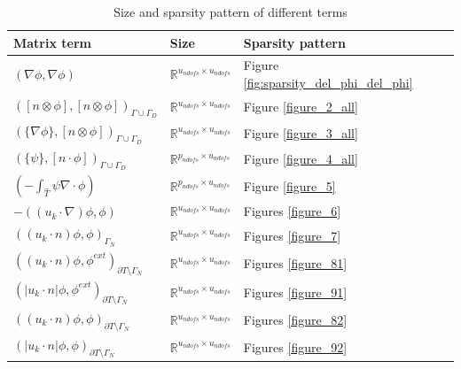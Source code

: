 \documentclass[a4paper,twoside,openright]{book}
\begin{document}
\begin{table}[H]
\caption{Size and sparsity pattern of different terms}
\begin{center}
\begin{tabular}{|p{}| p{} |  p{}|}
\hline
\textbf{Matrix term} & \textbf{Size} & \textbf{Sparsity pattern} \\
\hline
$(\nabla \phi, \nabla \phi)$ & $\mathbb{R}^{u_{ndofs} \times u_{ndofs}}$ & Figure \ref{fig:sparsity_del_phi_del_phi}\\
\hline
$([n \otimes \phi],[n \otimes \phi])_{\Gamma \cup \Gamma_D}$ & $\mathbb{R}^{u_{ndofs} \times u_{ndofs}}$ & Figure \ref{figure_2_all}\\
\hline
$(\lbrace \nabla \phi \rbrace,[n \otimes \phi])_{\Gamma \cup \Gamma_D}$ & $\mathbb{R}^{u_{ndofs} \times u_{ndofs}}$ & Figure \ref{figure_3_all}\\
\hline
$(\lbrace \psi \rbrace,[n \cdot \phi])_{\Gamma \cup \Gamma_D}$ & $\mathbb{R}^{p_{ndofs} \times u_{ndofs}}$ & Figure \ref{figure_4_all}\\
\hline
$(- \int_{\hat{T}} \psi \nabla \cdot \phi)$ & $\mathbb{R}^{p_{ndofs} \times u_{ndofs}}$ & Figure \ref{figure_5} \\
\hline
$-((u_k \cdot \nabla)\phi , \phi)$ & $\mathbb{R}^{u_{ndofs} \times u_{ndofs}}$ & Figures \ref{figure_6}\\
\hline
$((u_k \cdot n)\phi , \phi)_{\Gamma_N}$ & $\mathbb{R}^{u_{ndofs} \times u_{ndofs}}$ & Figures \ref{figure_7}\\
\hline
$((u_k \cdot n)\phi,\phi^{ext})_{\partial T \setminus \Gamma_N}$ & $\mathbb{R}^{u_{ndofs} \times u_{ndofs}}$ & Figures \ref{figure_81}\\
\hline
$(|u_k \cdot n|\phi,\phi^{ext})_{\partial T \setminus \Gamma_N}$ & $\mathbb{R}^{u_{ndofs} \times u_{ndofs}}$ & Figures \ref{figure_91}\\
\hline
$((u_k \cdot n)\phi,\phi)_{\partial T \setminus \Gamma_N}$ & $\mathbb{R}^{u_{ndofs} \times u_{ndofs}}$ & Figures \ref{figure_82}\\
\hline
$(|u_k \cdot n|\phi,\phi)_{\partial T \setminus \Gamma_N}$ & $\mathbb{R}^{u_{ndofs} \times u_{ndofs}}$ & Figures \ref{figure_92}\\
\hline
\end{tabular}
\end{center}
\end{table}
\end{document}
